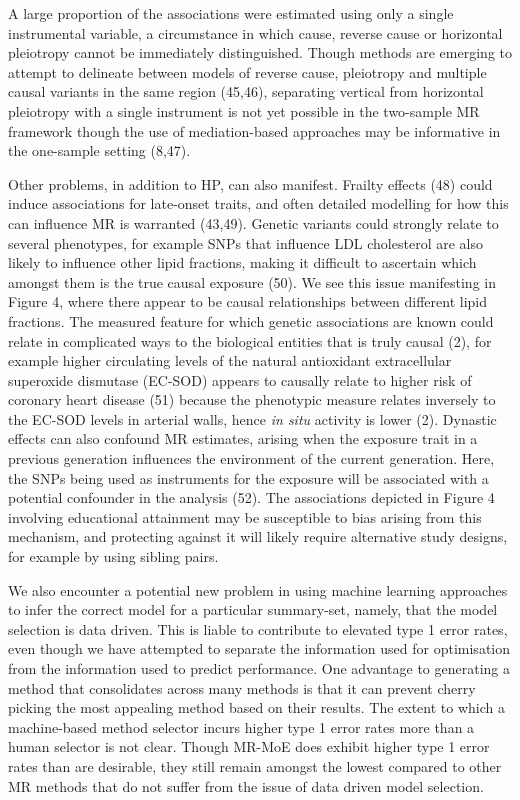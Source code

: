 \documentclass[]{article}
\begin{document}
A large proportion of the associations were estimated using only a
single instrumental variable, a circumstance in which cause, reverse
cause or horizontal pleiotropy cannot be immediately distinguished.
Though methods are emerging to attempt to delineate between models of
reverse cause, pleiotropy and multiple causal variants in the same
region (45,46), separating vertical from horizontal pleiotropy with a
single instrument is not yet possible in the two-sample MR framework
though the use of mediation-based approaches may be informative in the
one-sample setting (8,47).

Other problems, in addition to HP, can also manifest. Frailty effects
(48) could induce associations for late-onset traits, and often detailed
modelling for how this can influence MR is warranted (43,49). Genetic
variants could strongly relate to several phenotypes, for example SNPs
that influence LDL cholesterol are also likely to influence other lipid
fractions, making it difficult to ascertain which amongst them is the
true causal exposure (50). We see this issue manifesting in Figure 4,
where there appear to be causal relationships between different lipid
fractions. The measured feature for which genetic associations are known
could relate in complicated ways to the biological entities that is
truly causal (2), for example higher circulating levels of the natural
antioxidant extracellular superoxide dismutase (EC-SOD) appears to
causally relate to higher risk of coronary heart disease (51) because
the phenotypic measure relates inversely to the EC-SOD levels in
arterial walls, hence \emph{in situ} activity is lower (2). Dynastic
effects can also confound MR estimates, arising when the exposure trait
in a previous generation influences the environment of the current
generation. Here, the SNPs being used as instruments for the exposure
will be associated with a potential confounder in the analysis (52). The
associations depicted in Figure 4 involving educational attainment may
be susceptible to bias arising from this mechanism, and protecting
against it will likely require alternative study designs, for example by
using sibling pairs.

We also encounter a potential new problem in using machine learning
approaches to infer the correct model for a particular summary-set,
namely, that the model selection is data driven. This is liable to
contribute to elevated type 1 error rates, even though we have attempted
to separate the information used for optimisation from the information
used to predict performance. One advantage to generating a method that
consolidates across many methods is that it can prevent cherry picking
the most appealing method based on their results. The extent to which a
machine-based method selector incurs higher type 1 error rates more than
a human selector is not clear. Though MR-MoE does exhibit higher type 1
error rates than are desirable, they still remain amongst the lowest
compared to other MR methods that do not suffer from the issue of data
driven model selection.
\end{document}
